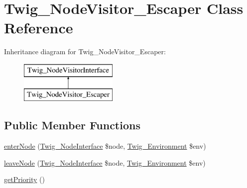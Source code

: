 \hypertarget{class_twig___node_visitor___escaper}{}\section{Twig\+\_\+\+Node\+Visitor\+\_\+\+Escaper Class Reference}
\label{class_twig___node_visitor___escaper}
Inheritance diagram for Twig\+\_\+\+Node\+Visitor\+\_\+\+Escaper\+:\begin{figure}[H]
\begin{center}
\leavevmode
\includegraphics[height=2.000000cm]{class_twig___node_visitor___escaper}
\end{center}
\end{figure}
\subsection*{Public Member Functions}
\begin{DoxyCompactItemize}
\item 
\hyperlink{class_twig___node_visitor___escaper_ad3bfee38f2bc56df9500da7f20b6e13a}{enter\+Node} (\hyperlink{interface_twig___node_interface}{Twig\+\_\+\+Node\+Interface} \$node, \hyperlink{class_twig___environment}{Twig\+\_\+\+Environment} \$env)
\item 
\hyperlink{class_twig___node_visitor___escaper_a436bb1ae16511148e860e5cfa2cad88f}{leave\+Node} (\hyperlink{interface_twig___node_interface}{Twig\+\_\+\+Node\+Interface} \$node, \hyperlink{class_twig___environment}{Twig\+\_\+\+Environment} \$env)
\item 
\hyperlink{class_twig___node_visitor___escaper_a1e7a3c168dcd0901a0d2669c67575b55}{get\+Priority} ()
\end{DoxyCompactItemize}
